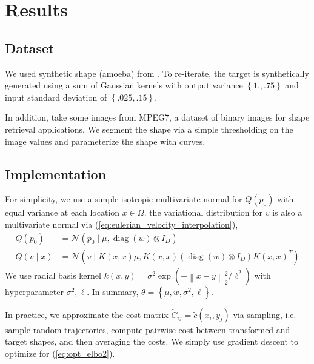 \documentclass{6838publ}
\newcommand\sN{\ensuremath{\mathcal{N}}}
\newcommand{\norm}[1]{\left\lVert#1\right\rVert}
\DeclareMathOperator*{\diag}{diag} %
\newcommand\pc[1]{\ensuremath{\left\{ #1 \right\}}} %
\begin{document}
\section{Results}


\subsection{Dataset}

We used synthetic shape (amoeba) from \cite{feydyOptimalTransportDiffeomorphic2017a}. To re-iterate, the target is synthetically generated using a sum of Gaussian kernels with output variance $\pc{1., .75}$ and input standard deviation of $\pc{.025, .15}$.

In addition, take some images from MPEG7, a dataset of binary images for shape retrieval applications. We segment the shape via a simple thresholding on the image values and parameterize the shape with curves.

\subsection{Implementation}

For simplicity, we use a simple isotropic multivariate normal for $Q(p_0)$ with equal variance at each location $x\in\Omega$. the variational distribution for $v$ is also a multivariate normal via (\ref{eq:eulerian_velocity_interpolation}),
\begin{align}
    Q(p_0)
        &= \sN(p_0\mid \mu, \diag(w) \otimes I_D) \\
    Q(v\mid x)
        &= \sN(v\mid K(x,x)\mu, K(x,x) (\diag(w)\otimes I_D) K(x,x)^T)
\end{align}
We use radial basis kernel $k(x,y) = \sigma^2 \exp(-\norm{x-y}_2^2/\ell^2)$ with hyperparameter $\sigma^2,\ell$. In summary, $\theta = \pc{\mu,w,\sigma^2,\ell}$.

In practice, we approximate the cost matrix $\widetilde{C}_{ij}=\widetilde{c}(x_i,y_j)$ via sampling, i.e. sample random trajectories, compute pairwise cost between transformed and target shapes, and then averaging the costs. We simply use gradient descent to optimize for (\ref{eq:opt_elbo2}). 
\end{document}
